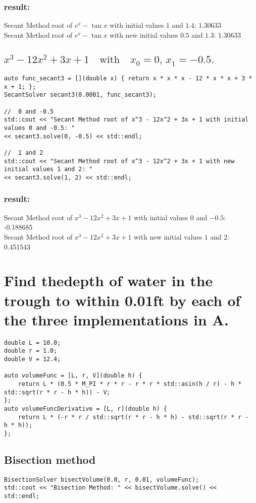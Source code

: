 \documentclass[a4paper]{article}
\begin{document}
\subsubsection*{result:}
Secant Method root of $e^x - \tan{x}$ with initial values $1$ and $1.4$: 1.30633 \\
Secant Method root of $e^x - \tan{x}$ with new initial values $0.5$ and $1.3$: 1.30633
\subsection{$x^3 - 12x^2 + 3x + 1 \quad \text{with} \quad x_0 = 0, \, x_1 = -0.5.$}
\begin{lstlisting}
auto func_secant3 = [](double x) { return x * x * x - 12 * x * x + 3 * x + 1; };
SecantSolver secant3(0.0001, func_secant3);

//  0 and -0.5
std::cout << "Secant Method root of x^3 - 12x^2 + 3x + 1 with initial values 0 and -0.5: "
<< secant3.solve(0, -0.5) << std::endl;

//  1 and 2
std::cout << "Secant Method root of x^3 - 12x^2 + 3x + 1 with new initial values 1 and 2: "
<< secant3.solve(1, 2) << std::endl;
\end{lstlisting}
\subsubsection*{result:}
Secant Method root of $x^3 - 12x^2 + 3x + 1$ with initial values $0$ and $-0.5$: -0.188685 \\
Secant Method root of $x^3 - 12x^2 + 3x + 1$ with new initial values $1$ and $2$: 0.451543
\section{ Find thedepth of water in the trough to within 0.01ft by each of
the three implementations in A.}
\begin{lstlisting}
double L = 10.0;
double r = 1.0;
double V = 12.4;

auto volumeFunc = [L, r, V](double h) {
    return L * (0.5 * M_PI * r * r - r * r * std::asin(h / r) - h * std::sqrt(r * r - h * h)) - V;
};
auto volumeFuncDerivative = [L, r](double h) {
    return L * (-r * r / std::sqrt(r * r - h * h) - std::sqrt(r * r - h * h));
};
\end{lstlisting}
\subsection{Bisection method}
\begin{lstlisting}
BisectionSolver bisectVolume(0.0, r, 0.01, volumeFunc);
std::cout << "Bisection Method: " << bisectVolume.solve() << std::endl;
\end{lstlisting}
\end{document}
